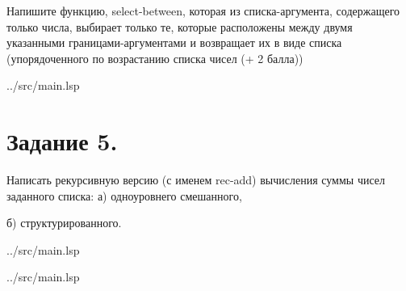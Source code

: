 Напишите функцию, select-between, которая из списка-аргумента, содержащего только числа, выбирает только те, которые расположены между двумя указанными границами-аргументами и возвращает их в виде списка (упорядоченного по возрастанию списка чисел (+ 2 балла))

\begin{lstinputlisting}[
	caption={Задание 4},
	label={lst:t4},
	style={lsp},
	linerange={39-49},
	]{../src/main.lsp}
\end{lstinputlisting}

\section*{Задание 5. }
Написать рекурсивную версию (с именем rec-add) вычисления суммы чисел заданного списка:
а) одноуровнего смешанного,

б) структурированного.

\begin{lstinputlisting}[
	caption={Задание 5, a},
	label={lst:t5-1},
	style={lsp},
	linerange={51-57},
	]{../src/main.lsp}
\end{lstinputlisting}

\begin{lstinputlisting}[
	caption={Задание 5, б},
	label={lst:t5-2},
	style={lsp},
	linerange={59-66},
	]{../src/main.lsp}
\end{lstinputlisting}